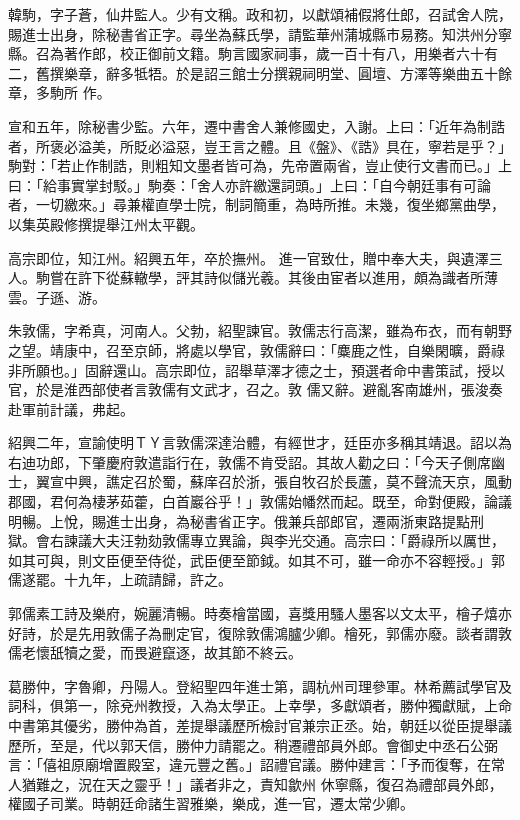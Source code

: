 \begin{pinyinscope}
 韓駒，字子蒼，仙井監人。少有文稱。政和初，以獻頌補假將仕郎，召試舍人院，賜進士出身，除秘書省正字。尋坐為蘇氏學，請監華州蒲城縣市易務。知洪州分寧縣。召為著作郎，校正御前文籍。駒言國家祠事，歲一百十有八，用樂者六十有二，舊撰樂章，辭多牴牾。於是詔三館士分撰親祠明堂、圓壇、方澤等樂曲五十餘章，多駒所
 作。



 宣和五年，除秘書少監。六年，遷中書舍人兼修國史，入謝。上曰：「近年為制誥者，所褒必溢美，所貶必溢惡，豈王言之體。且《盤》、《誥》具在，寧若是乎？」駒對：「若止作制誥，則粗知文墨者皆可為，先帝置兩省，豈止使行文書而已。」上曰：「給事實掌封駁。」駒奏：「舍人亦許繳還詞頭。」上曰：「自今朝廷事有可論者，一切繳來。」尋兼權直學士院，制詞簡重，為時所推。未幾，復坐鄉黨曲學，以集英殿修撰提舉江州太平觀。



 高宗即位，知江州。紹興五年，卒於撫州。
 進一官致仕，贈中奉大夫，與遺澤三人。駒嘗在許下從蘇轍學，評其詩似儲光羲。其後由宦者以進用，頗為識者所薄雲。子遜、游。



 朱敦儒，字希真，河南人。父勃，紹聖諫官。敦儒志行高潔，雖為布衣，而有朝野之望。靖康中，召至京師，將處以學官，敦儒辭曰：「麋鹿之性，自樂閑曠，爵祿非所願也。」固辭還山。高宗即位，詔舉草澤才德之士，預選者命中書策試，授以官，於是淮西部使者言敦儒有文武才，召之。敦
 儒又辭。避亂客南雄州，張浚奏赴軍前計議，弗起。



 紹興二年，宣諭使明ＴＹ言敦儒深達治體，有經世才，廷臣亦多稱其靖退。詔以為右迪功郎，下肇慶府敦遣詣行在，敦儒不肯受詔。其故人勸之曰：「今天子側席幽士，翼宣中興，譙定召於蜀，蘇庠召於浙，張自牧召於長蘆，莫不聲流天京，風動郡國，君何為棲茅茹藿，白首巖谷乎！」敦儒始幡然而起。既至，命對便殿，論議明暢。上悅，賜進士出身，為秘書省正字。俄兼兵部郎官，遷兩浙東路提點刑
 獄。會右諫議大夫汪勃劾敦儒專立異論，與李光交通。高宗曰：「爵祿所以厲世，如其可與，則文臣便至侍從，武臣便至節鉞。如其不可，雖一命亦不容輕授。」郭儒遂罷。十九年，上疏請歸，許之。



 郭儒素工詩及樂府，婉麗清暢。時奏檜當國，喜獎用騷人墨客以文太平，檜子熺亦好詩，於是先用敦儒子為刪定官，復除敦儒鴻臚少卿。檜死，郭儒亦廢。談者謂敦儒老懷舐犢之愛，而畏避竄逐，故其節不終云。



 葛勝仲，字魯卿，丹陽人。登紹聖四年進士第，調杭州司理參軍。林希薦試學官及詞科，俱第一，除兗州教授，入為太學正。上幸學，多獻頌者，勝仲獨獻賦，上命中書第其優劣，勝仲為首，差提舉議歷所檢討官兼宗正丞。始，朝廷以從臣提舉議歷所，至是，代以郭天信，勝仲力請罷之。稍遷禮部員外郎。會御史中丞石公弼言：「僖祖原廟增置殿室，違元豐之舊。」詔禮官議。勝仲建言：「予而復奪，在常人猶難之，況在天之靈乎！」議者非之，責知歙州
 休寧縣，復召為禮部員外郎，權國子司業。時朝廷命諸生習雅樂，樂成，進一官，遷太常少卿。




\end{pinyinscope}
